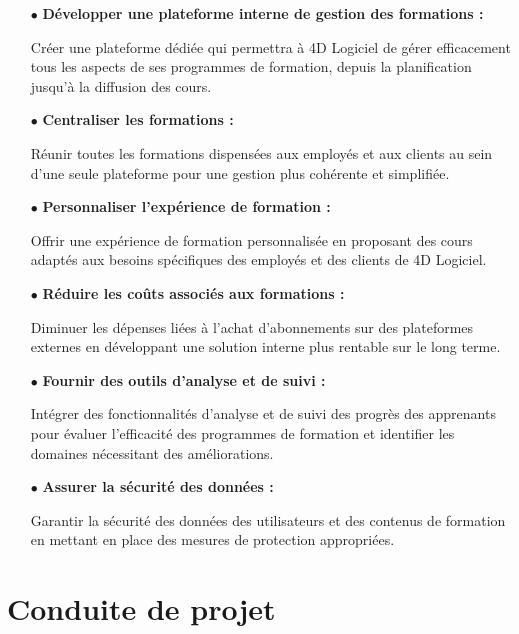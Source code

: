 \begin{itemize}
    \item[$\bullet$] \textbf{Développer une plateforme interne de gestion des formations :} 
    
    Créer une plateforme dédiée qui permettra à 4D Logiciel de gérer efficacement tous les aspects de ses programmes de formation, depuis la planification jusqu'à la diffusion des cours.

    \item[$\bullet$] \textbf{Centraliser les formations :} 
    
    Réunir toutes les formations dispensées aux employés et aux clients au sein d'une seule plateforme pour une gestion plus cohérente et simplifiée.

    \item[$\bullet$] \textbf{Personnaliser l'expérience de formation :} 
    
    Offrir une expérience de formation personnalisée en proposant des cours adaptés aux besoins spécifiques des employés et des clients de 4D Logiciel.

    \item[$\bullet$] \textbf{Réduire les coûts associés aux formations :} 
    
    Diminuer les dépenses liées à l'achat d'abonnements sur des plateformes externes en développant une solution interne plus rentable sur le long terme.

    \item[$\bullet$] \textbf{Fournir des outils d'analyse et de suivi :} 
    
    Intégrer des fonctionnalités d'analyse et de suivi des progrès des apprenants pour évaluer l'efficacité des programmes de formation et identifier les domaines nécessitant des améliorations.
   
    \item[$\bullet$] \textbf{Assurer la sécurité des données :} 
    
    Garantir la sécurité des données des utilisateurs et des contenus de formation en mettant en place des mesures de protection appropriées.

\end{itemize}

\section{Conduite de projet}

